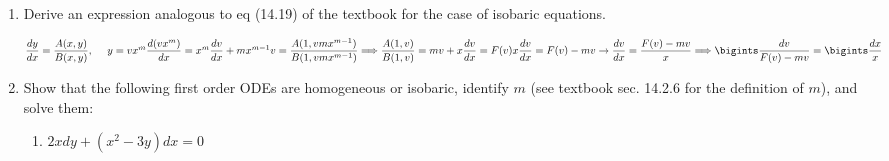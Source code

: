 \documentclass[fleqn]{article}
\begin{document}
  \begin{enumerate}

    \item  Derive an expression analogous to eq (14.19) of the textbook for the case of isobaric equations. 
    
      \textcolor{hwColor}{
        $
          \dfrac{dy}{dx}=\dfrac{A(x,y)}{B(x,y)}, ~~~~ y=vx^m \\
          \\
          \dfrac{d(vx^m)}{dx}=x^m\dfrac{dv}{dx}+mx^{m-1}v=\dfrac{A(1, vmx^{m-1})}{B(1, vmx^{m-1})} \\
          \\
          \Longrightarrow \dfrac{A(1,v)}{B(1,v)}=mv+x\dfrac{dv}{dx}=F(v) \\
          x\dfrac{dv}{dx}=F(v)-mv \rightarrow \dfrac{dv}{dx}=\dfrac{F(v)-mv}{x} \\
          \\
          \\
          \Longrightarrow \bigints \dfrac{dv}{F(v)-mv}=\bigints \dfrac{dx}{x}
        $     
      }

    
    \item  Show that the following first order ODEs are homogeneous or isobaric, identify $m$ (see textbook sec. 14.2.6 for the definition of $m$), and solve them:
      \begin{enumerate}
        \item $2xdy+(x^2-3y)dx=0$


\end{enumerate}
\end{enumerate}
\end{document}
